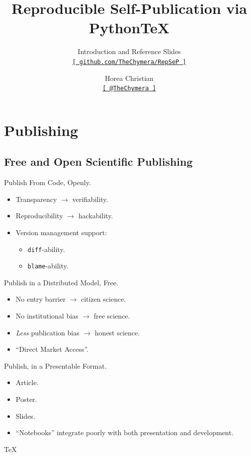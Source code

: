 
\title[Reproducible Self-Publication via Python\TeX\ --- Introduction and Reference Slides]{Reproducible Self-Publication via Python\TeX}
\subtitle{Introduction and Reference Slides\\\href{https://github.com/TheChymera/RepSeP}{\small\texttt{[ github.com/TheChymera/RepSeP ]}}}
\author[Horea Christian]{Horea Christian\\\href{https://twitter.com/TheChymera}{\small\texttt{[ @TheChymera ]}}}

	\begin{frame}
		\titlepage
	\end{frame}
	\section{Publishing}
		\subsection{Free and Open Scientific Publishing}
			\begin{frame}{Publish From Code, Openly.}
				\begin{itemize}
					\item Transparency $\longrightarrow$ verifiability.
					\item Reproducibility $\longrightarrow$ hackability.
					\item Version management support:
					\begin{itemize}
						\item \colorbox{tlg}{\texttt{diff}}-ability.
						\item \colorbox{tlg}{\texttt{blame}}-ability.
					\end{itemize}
				\end{itemize}
			\end{frame}
			\begin{frame}{Publish in a Distributed Model, Free.}
				\begin{itemize}
					\item No entry barrier $\longrightarrow$ citizen science.
					\item No institutional bias $\longrightarrow$ free science.
					\item \textit{Less} publication bias $\longrightarrow$ honest science.
					\item “Direct Market Access”.
				\end{itemize}
			\end{frame}
			\begin{frame}{Publish, in a Presentable Format.}
				\begin{itemize}
					\item Article.
					\item Poster.
					\item Slides.
					\item “Notebooks” integrate poorly with both presentation and development.
				\end{itemize}
				\vspace{2.5em}
				\centerline{\Huge \textcolor{rsblue}{\TeX}}
			\end{frame}
